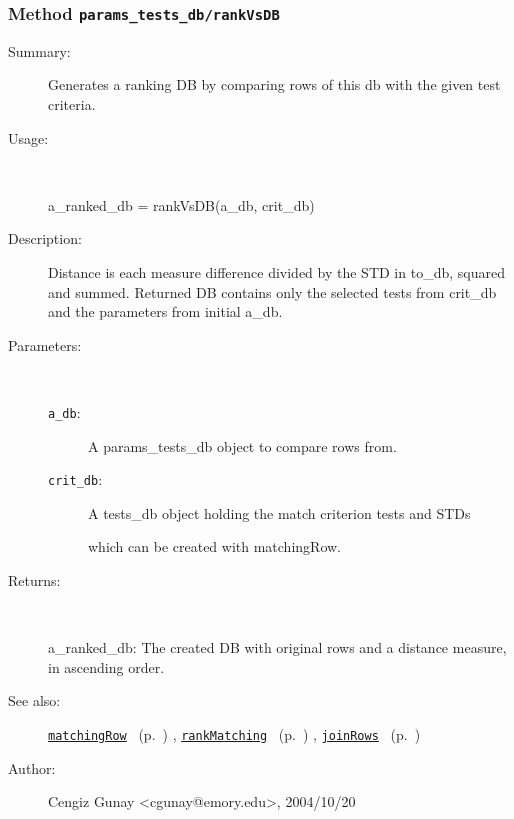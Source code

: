 \subsubsection[Method \texttt{rankVsDB}]{Method \texttt{params\_tests\_db/rankVsDB}}%
%
\label{ref_params_tests_db__rankVsDB}%
\hypertarget{ref_params_tests_db__rankVsDB}{}%
\begin{description}
\item[Summary:]Generates a ranking DB by comparing rows of this db with the given test criteria.
%
\item[Usage:]~%
\begin{lyxcode}%
a\_ranked\_db = rankVsDB(a\_db, crit\_db)
%
\end{lyxcode}%
%
\item[Description:]%
Distance is each measure difference divided by the STD in to\_db, squared and
 summed. Returned DB contains only the selected tests from crit\_db and the parameters
 from initial a\_db.
\item[Parameters:]~
\begin{description}%
\item[\texttt{a\_db}:]
 A params\_tests\_db object to compare rows from.
\item[\texttt{crit\_db}:]
 A tests\_db object holding the match criterion tests and STDs

which can be created with matchingRow.
\end{description}%
%
\item[Returns:
]~

	a\_ranked\_db: The created DB with original rows and a distance measure, 
		   in ascending order. 
%
%
\item[See also:]%
\hyperlink{ref_matchingRow}{\texttt{matchingRow}}%
\ (p.~\pageref{ref_matchingRow})%
%
, \hyperlink{ref_rankMatching}{\texttt{rankMatching}}%
\ (p.~\pageref{ref_rankMatching})%
%
, \hyperlink{ref_joinRows}{\texttt{joinRows}}%
\ (p.~\pageref{ref_joinRows})%
%
%
\item[Author:]%
Cengiz Gunay <cgunay@emory.edu>, 2004/10/20
%
\end{description}
\methodline%
